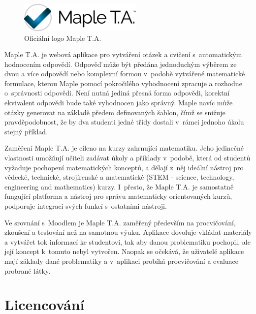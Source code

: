 \documentclass[
print,
  11pt,
  table,   
  nolof,    
  nolot,
  oneside,
  draft
]{fithesis3}
\begin{document}
		\begin{figure}
		  \begin{center}
		    \includegraphics[width=60mm]{images/MapleTA_logo.jpg}
		   \end{center}
		  \caption{Oficiální logo Maple T.A.  \cite{maple-logo}}
		  \label{fig:maplelogo}
		\end{figure}

Maple T.A. je webová aplikace pro vytváření otázek a cvičení s~automatickým hodnocením odpovědí. Odpověď může být předána jednoduchým výběrem ze dvou a více odpovědí nebo komplexní formou v~podobě vytvářené matematické formulace, kterou Maple pomocí pokročilého vyhodnocení zpracuje a rozhodne o~správnosti odpovědi. Není nutná jediná přesná forma odpovědi, korektní ekvivalent odpovědi bude také vyhodnocen jako správný. Maple navíc může otázky generovat na základě předem definovaných šablon, čímž se snižuje pravděpodobnost, že by dva studenti jedné třídy dostali v~rámci jednoho úkolu stejný příklad.\cite{heck2004}

Zaměření Maple T.A. je cíleno na kurzy zahrnující matematiku. Jeho jedinečné vlastnosti umožňují učiteli zadávat úkoly a příklady v~podobě, která od studentů vyžaduje pochopení matematických konceptů, a dělají z~něj ideální nástroj pro vědecké, technické, strojírenské a matematické (STEM - science, technology, engineering and mathematics) kurzy. I~přesto, že Maple T.A. je samostatně fungující platforma a nástroj pro správu matematicky orientovaných kurzů, podporuje integraci svých funkcí s~ostatními nástroji. \cite{mapleta} 


Ve srovnání s~Moodlem je Maple T.A. zaměřený především na procvičování, zkoušení a testování než na samotnou výuku. Aplikace dovoluje vkládat materiály a vytvářet tok informací ke studentovi, tak aby danou problematiku pochopil, ale její koncept k~tomuto nebyl vytvořen. Naopak se očekává, že uživatelé aplikace mají základy dané problematiky a v~aplikaci probíhá procvičování a evaluace probrané látky.


	\section{Licencování}
\end{document}
